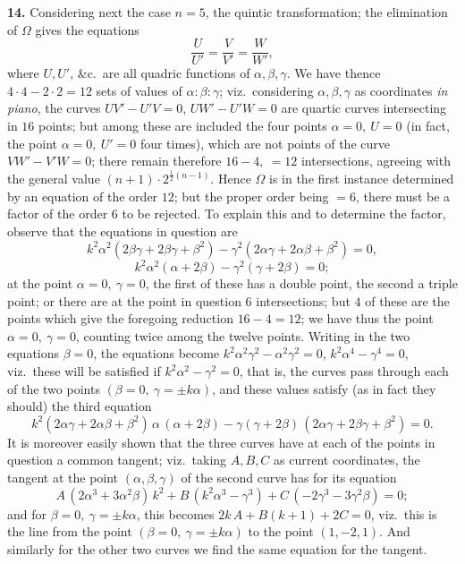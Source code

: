 \documentclass[11pt]{article}
\begin{document}
\medskip
\textbf{14.} Considering next the case $n=5$, the quintic transformation;
the elimination of $\Omega$ gives the equations
\[
\frac{U}{U'} = \frac{V}{V'} = \frac{W}{W'},
\]
where $U, U'$, \&c.\ are all quadric functions of $\alpha,\beta,\gamma$. We
have thence $4\cdot 4 - 2\cdot 2 = 12$ sets of values of $\alpha:\beta:\gamma$;
viz.\ considering $\alpha,\beta,\gamma$ as coordinates \emph{in piano}, the
curves $UV' - U'V = 0$, $UW' - U'W = 0$ are quartic curves intersecting in
$16$ points; but among these are included the four points $\alpha=0,\ U=0$
(in fact, the point $\alpha=0,\ U'=0$ four times), which are not points of
the curve $VW' - V'W = 0$; there remain therefore $16-4,\ =12$
intersections, agreeing with the general value $(n+1)\cdot 2^{\frac{1}{2}(n-1)}$.
Hence $\Omega$ is in the first instance determined by an equation of the
order $12$; but the proper order being $=6$, there must be a factor of the
order $6$ to be rejected. To explain this and to determine the factor,
observe that the equations in question are
\[
k^2\alpha^2(2\beta\gamma + 2\beta\gamma + \beta^2) - \gamma^2(2\alpha\gamma + 2\alpha\beta + \beta^2) = 0,
\]
\[
k^2\alpha^2(\alpha+2\beta) - \gamma^2(\gamma + 2\beta) = 0;
\]
at the point $\alpha=0,\ \gamma=0$, the first of these has a double point,
the second a triple point; or there are at the point in question $6$
intersections; but $4$ of these are the points which give the foregoing
reduction $16-4=12$; we have thus the point $\alpha=0,\ \gamma=0$, counting
twice among the twelve points. Writing in the two equations $\beta=0$, the
equations become $k^2\alpha^2\gamma^2 - \alpha^2\gamma^2 = 0$,
$k^2\alpha^4 - \gamma^4 = 0$, viz.\ these will be satisfied if
$k^2\alpha^2 - \gamma^2 = 0$, that is, the curves pass through each of the
two points $(\beta=0,\ \gamma=\pm k\alpha)$, and these values satisfy (as
in fact they should) the third equation
\[
k^2(2\alpha\gamma + 2\alpha\beta + \beta^2)\,\alpha\,(\alpha+2\beta) - \gamma(\gamma+2\beta)\,(2\alpha\gamma + 2\beta\gamma + \beta^2) = 0.
\]
It is moreover easily shown that the three curves have at each of the
points in question a common tangent; viz.\ taking $A,B,C$ as current
coordinates, the tangent at the point $(\alpha,\beta,\gamma)$ of the second
curve has for its equation
\[
A\,(2\alpha^3 + 3\alpha^2\beta)\,k^2 + B\,(k^2\alpha^3 - \gamma^3) + C\,(-2\gamma^3 - 3\gamma^2\beta) = 0;
\]
and for $\beta=0,\ \gamma=\pm k\alpha$, this becomes
$2k\,A + B(k+1) + 2C = 0$, viz.\ this is the line from the point
$(\beta=0,\ \gamma=\pm k\alpha)$ to the point $(1,-2,1)$. And similarly for
the other two curves we find the same equation for the tangent.
\end{document}
